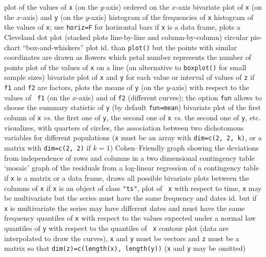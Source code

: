 	{plot of the values of {\tt x} (on the $y$-axis) ordered on the
$x$-axis}
	{bivariate plot of {\tt x} (on the $x$-axis) and {\tt y}
(on the $y$-axis)}
	{ histogram of the frequencies of {\tt x}}
	{histogram of the values of {\tt x}; use {\tt horiz=F} for
horizontal bars}
	{if {\tt x} is a data frame, plots a Cleveland dot plot
(stacked plots line-by-line and column-by-column)}
	{ circular pie-chart}
	{ ``box-and-whiskers'' plot}
	{id. than {\tt plot()} but the points with similar
coordinates are drawn as flowers which petal number represents the number of
points}
	{plot of the values of {\tt x} on a line (an alternative to
{\tt boxplot()} for small sample sizes)}
	{bivariate plot of {\tt x} and {\tt y} for each
value or interval of values of {\tt z}}
	{if {\tt f1} and {\tt f2} are factors,
plots the means of {\tt y} (on the $y$-axis) with respect to the values of {\tt
f1} (on the $x$-axis) and of {\tt f2} (different curves); the option {\tt fun}
allows to choose the summary statistic of {\tt y} (by default {\tt fun=mean})}
	{bivariate plot of the first column of {\tt x} {\it vs.}
the first one of {\tt y}, the second one of {\tt x} {\it vs.} the second one of
{\tt y}, etc.}
	{visualizes, with quarters of circles, the association
between two dichotomous variables for different populations ({\tt x} must be an
array with {\tt dim=c(2, 2, k)}, or a matrix with {\tt dim=c(2, 2)} if $k=1$)}
	{ Cohen--Friendly graph showing the deviations  from
independence of rows and columns in a two dimensional contingency table}
	{ `mosaic' graph of the residuals from a log-linear
regression of a contingency table}
	{if {\tt x} is a matrix or a data frame, draws all possible
bivariate plots between the columns of {\tt x}}
	{if {\tt x} is an object of class {\tt "ts"}, plot of {\tt
x} with respect to time, {\tt x}  may be multivariate but the series must have
the same frequency and dates}
	{id. but if {\tt x} is multivariate the series may have
different dates and must have the same frequency}
	{quantiles of {\tt x} with respect to the values expected
under a normal law}
	{quantiles of {\tt y} with respect to the quantiles of {\tt
x}}
	{contour plot (data are interpolated to draw the
curves), {\tt x} and {\tt y} must be vectors and {\tt z} must be a matrix so
that {\tt dim(z)=c(length(x), length(y))} ({\tt x} and {\tt y} may be omitted)}
